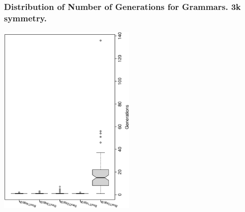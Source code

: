  \begin{frame}
 \frametitle{ Distribution of Number of Generations for Grammars. 3k  symmetry. }
 \begin{center}
\includegraphics[width=0.5\textwidth, angle=-90]
{ExpBboxplottGenerations001.eps}
 \end{center}
 \label{ExpBboxplottGenerations001.eps}  
 \end{frame}

